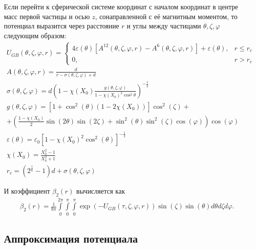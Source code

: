 \documentclass[a4paper,14pt]{extarticle}
\begin{document}
    Если перейти к сферической системе координат с началом координат в центре масс первой частицы и осью $z$, сонаправленной с её магнитным моментом, то потенциал выразится через расстояние $r$ и углы между частицами $\theta, \zeta, \varphi$ следующим образом:
    \begin{gather*}
        U_{GB} (\theta, \zeta, \varphi, r) =
        \begin{cases}
            4 \varepsilon(\theta)
            \left[
            A^{12}(\theta, \zeta, \varphi, r)
            - A^{6}(\theta, \zeta, \varphi, r)
            \right]
            + \varepsilon(\theta)
            , & r \leqslant r_c \\
            0, & r > r_c
        \end{cases} \\
        A(\theta, \zeta, \varphi, r)
        = \frac{d}{r - \sigma(\theta, \zeta, \varphi) + d} \\
        \sigma(\theta, \zeta, \varphi)
        = d \left(
        1 -
        \chi(X_0)
        \frac{g(\theta, \zeta, \varphi)}
        {1-\chi(X_0)^2 \cos^2 \theta}
        \right)^{-\frac12} \\
        g(\theta, \zeta, \varphi)
        = \left[ 1 + \cos^2(\theta) (1 - 2 \chi(X_0))\right]
        \cos^2(\zeta) + \\
        + \left(
        \frac{1 - \chi(X_0)}{2}
        \sin (2 \theta)
        \sin (2 \zeta)
        + \sin^2(\theta)
        \sin^2(\zeta)
        \cos(\varphi)
        \right)
        \cos(\varphi) \\
        \varepsilon(\theta)
        = \varepsilon_0  [1-\chi(X_0)^2 \cos^2(\theta)]^{-\frac12} \\
        \chi(X_0) =
        \frac{X_0^2-1}{X_0^2+1} \\
        r_c = (2^{\frac16} - 1)d + \sigma(\theta, \zeta, \varphi)
    \end{gather*}

    И коэффициент $\beta_2(r)$ вычисляется как
    \begin{gather*}
        \beta_2(r) =
        \frac{1}{8\pi}
        \int\limits_{0}^{2 \pi}
        \int\limits_{0}^{\pi}
        \int\limits_{0}^{\pi}
        \exp \left(
        - U_{GB} (\tau, \zeta, \varphi, r)
        \right)
        \sin (\zeta)
        \sin(\theta)
        d \theta
        d \zeta
        d \varphi.
    \end{gather*}

    \subsection{Аппроксимация потенциала}
\end{document}
